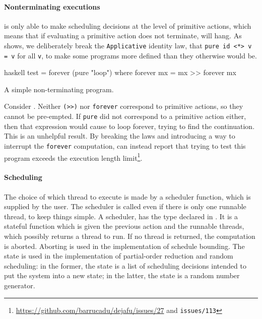 \paragraph{Nonterminating executions}
\dejafu{} is only able to make scheduling decisions at the level of
primitive actions, which means that if evaluating a primitive action
does not terminate, \dejafu{} will hang.  As  shows,
we deliberately break the \verb|Applicative| identity law, that
\verb|pure id <*> v = v| for all \verb|v|, to make some programs more
defined than they otherwise would be.

\begin{listing}
\centering
\begin{cminted}{haskell}
test = forever (pure "loop") where
  forever mx = mx >> forever mx
\end{cminted}
\caption{A simple non-terminating program.}\label{lst:forever}
\end{listing}

Consider .  Neither \verb|(>>)| nor \verb|forever|
correspond to primitive actions, so they cannot be pre-empted.  If
\verb|pure| did not correspond to a primitive action either, then that
expression would cause \dejafu{} to loop forever, trying to find the
continuation.  This is an unhelpful result.  By breaking the laws and
introducing a way to interrupt the \verb|forever| computation,
\dejafu{} can instead report that trying to test this program exceeds
the execution length
limit\footnote{\url{https://github.com/barrucadu/dejafu/issues/27} and \texttt{issues/113}}.

\paragraph{Scheduling}
The choice of which thread to execute is made by a scheduler function,
which is supplied by the user.  The scheduler is called even if there
is only one runnable thread, to keep things simple.  A scheduler, has
the type declared in .  It is a stateful function
which is given the previous action and the runnable threads, which
possibly returns a thread to run.  If no thread is returned, the
computation is aborted.  Aborting is used in the implementation of
schedule bounding.  The state is used in the implementation of
partial-order reduction and random scheduling: in the former, the
state is a list of scheduling decisions intended to put the system
into a new state; in the latter, the state is a random number
generator.

